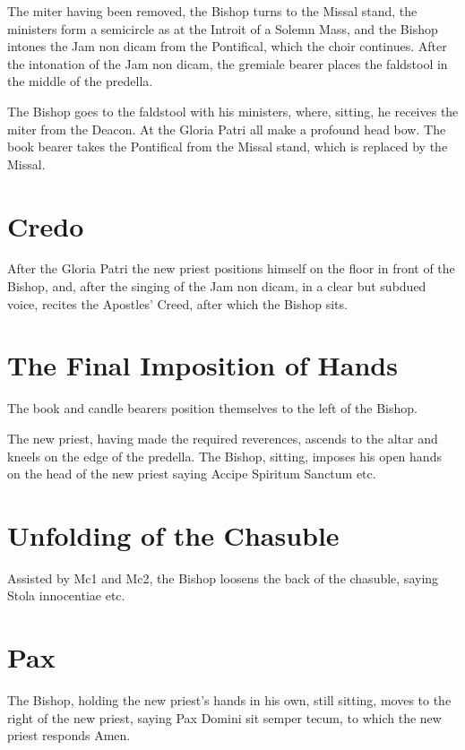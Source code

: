 \documentclass{report}
\begin{document}
{	The miter having been removed, the Bishop turns to the Missal stand, the
	ministers form a semicircle as at the Introit of a Solemn Mass, and the
	Bishop intones the Jam non dicam from the Pontifical, which the choir
	continues. After the intonation of the Jam non dicam, the gremiale bearer
	places the faldstool in the middle of the predella.

	The Bishop goes to the faldstool with his ministers, where, sitting, he
	receives the miter from the Deacon. At the Gloria Patri all make a profound
	head bow. The book bearer takes the Pontifical from the Missal stand, which
	is replaced by the Missal.

	\section{Credo}

	After the Gloria Patri the new priest positions himself on the floor in
	front of the Bishop, and, after the singing of the Jam non dicam, in a
	clear but subdued voice, recites the Apostles’ Creed, after which the
	Bishop sits.

	\section{The Final Imposition of Hands}

	The book and candle bearers position themselves to the left of the Bishop.

	The new priest, having made the required reverences, ascends to the altar
	and kneels on the edge of the predella. The Bishop, sitting, imposes his
	open hands on the head of the new priest saying Accipe Spiritum Sanctum
	etc.

	\section{Unfolding of the Chasuble}

	Assisted by Mc1 and Mc2, the Bishop loosens the back of the chasuble,
	saying Stola innocentiae etc.

	\section{Pax}

	The Bishop, holding the new priest’s hands in his own, still sitting, moves
	to the right of the new priest, saying Pax Domini sit semper tecum, to
	which the new priest responds Amen.

}
\end{document}
